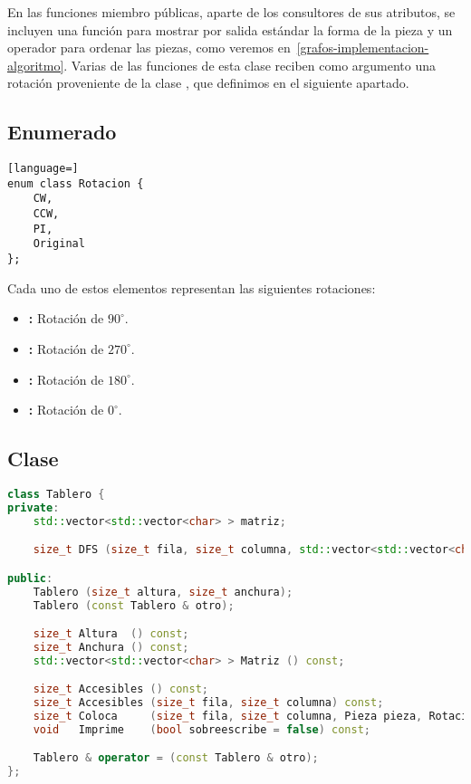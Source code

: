 En las funciones miembro públicas, aparte de los consultores de sus atributos, se incluyen una función para mostrar por salida estándar la forma de la pieza y un operador \code{<} para ordenar las piezas, como veremos en~\ref{grafos-implementacion-algoritmo}.
Varias de las funciones de esta clase reciben como argumento una rotación proveniente de la clase , que definimos en el siguiente apartado.

\pagebreak

\subsection{Enumerado }\label{grafos-implementacion-rotacion}

\begin{lstlisting}[language=]
enum class Rotacion {
	CW,
	CCW,
	PI,
	Original
};
\end{lstlisting}

Cada uno de estos elementos representan las siguientes rotaciones:

\begin{itemize}
	\item{}\textbf{:} Rotación de $90^{\circ}$.
	\item{}\textbf{:} Rotación de $270^{\circ}$.
	\item{}\textbf{:} Rotación de $180^{\circ}$.
	\item{}\textbf{:} Rotación de $0^{\circ}$.
\end{itemize}

\subsection{Clase }\label{grafos-implementacion-tablero}

\begin{lstlisting}[language=C++]
class Tablero {
private:
	std::vector<std::vector<char> > matriz;

	size_t DFS (size_t fila, size_t columna, std::vector<std::vector<char> > & matriz) const;

public:
	Tablero (size_t altura, size_t anchura);
	Tablero (const Tablero & otro);

	size_t Altura  () const;
	size_t Anchura () const;
	std::vector<std::vector<char> > Matriz () const;

	size_t Accesibles () const;
	size_t Accesibles (size_t fila, size_t columna) const;
	size_t Coloca     (size_t fila, size_t columna, Pieza pieza, Rotacion rotacion = Rotacion::Original);
	void   Imprime    (bool sobreescribe = false) const;

	Tablero & operator = (const Tablero & otro);
};
\end{lstlisting}

